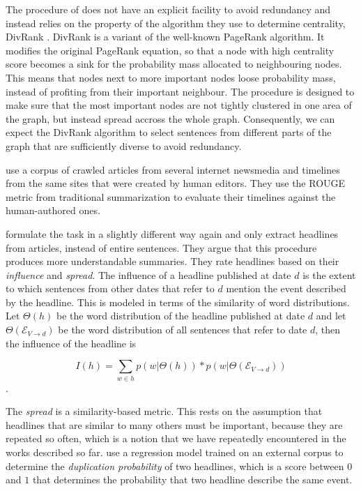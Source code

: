 \documentclass[a4paper,BCOR=10mm]{report}
\numberwithin{lemma}{chapter}
\numberwithin{definition}{chapter}
\begin{document}
The procedure of \citet{yan-trans} does not have an explicit facility to avoid redundancy and instead relies on the property of the algorithm they use to determine centrality, DivRank \citep{divrank}. DivRank is a variant of the well-known PageRank \citep{pagerank} algorithm. It modifies the original PageRank equation, so that a node with high centrality score becomes a sink for the probability mass allocated to neighbouring nodes. This means that nodes next to more important nodes loose probability mass, instead of profiting from their important neighbour. The procedure is designed to make sure that the most important nodes are not tightly clustered in one area of the graph, but instead spread accross the whole graph. Consequently, we can expect the DivRank algorithm to select sentences from different parts of the graph that are sufficiently diverse to avoid redundancy.

\citet{yan-trans} use a corpus of crawled articles from several internet newsmedia and timelines from the same sites that were created by human editors.
They use the ROUGE \citep{rouge} metric from traditional summarization to evaluate their timelines against the human-authored ones.

\citet{tran-headlines} formulate the task in a slightly different way again and only extract headlines from articles, instead of entire sentences. They argue that this procedure produces more understandable summaries.
They rate headlines based on their \textit{influence} and \textit{spread}.
The influence of a headline published at date $d$ is the extent to which sentences from other dates that refer to $d$ mention the event described by the headline.
This is modeled in terms of the similarity of word distributions. Let $\Theta(h)$ be the word distribution of the headline published at date $d$ and let $\Theta(\mathcal{E}_{V \rightarrow d})$ be the word distribution of all sentences that refer to date $d$, then the influence of the headline is

\begin{equation}
I(h) = \sum_{w \in h} p(w|\Theta(h)) * p(w|\Theta(\mathcal{E}_{V \rightarrow d}))
\end{equation}.

The \textit{spread} is a similarity-based metric. This rests on the assumption that headlines that are similar to many others must be important, because they are repeated so often, which is a notion that we have repeatedly encountered in the works described so far.
\citeauthor{tran-headlines} use a regression model trained on an external corpus to determine the \textit{duplication probability} of two headlines, which is a score between $0$ and $1$ that determines the probability that two headline describe the same event.
\end{document}
